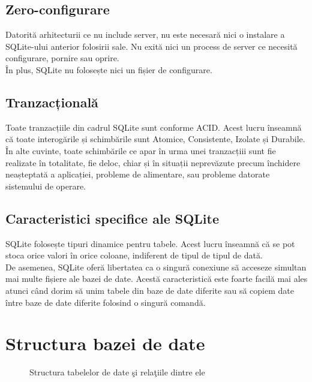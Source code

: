 \subsection{Zero-configurare}
Datorită arhitecturii ce nu include server, nu este necesară nici o instalare a SQLite-ului anterior folosirii sale. Nu exită nici un process de server ce necesită configurare, pornire sau oprire.
\vspace{6pt}
\\În plus, SQLite nu folosește nici un fișier de configurare.

\subsection{Tranzacțională}
Toate tranzacțiile din cadrul SQLite sunt conforme ACID. Acest lucru înseamnă că toate interogările și schimbările sunt Atomice, Consistente, Izolate și Durabile.
\vspace{6pt}
\\În alte cuvinte, toate schimbările ce apar în urma unei tranzacțiii sunt fie realizate în totalitate, fie deloc, chiar și în situații neprevăzute precum închidere neașteptată a aplicației, probleme de alimentare, sau probleme datorate sistemului de operare.

\subsection{Caracteristici specifice ale SQLite}
SQLite folosește tipuri dinamice pentru tabele. Acest lucru înseamnă că se pot stoca orice valori în orice coloane, indiferent de tipul de tipul de dată.
\vspace{6pt}
\\De asemenea, SQLite oferă libertatea ca o singură conexiune să acceseze simultan mai multe fișiere ale bazei de date. Acestă caracteristică este foarte facilă mai ales atunci când dorim să unim tabele din baze de date diferite sau să copiem date între baze de date diferite folosind o singură comandă.


\section{Structura bazei de date}

\begin{figure}[h!]
  \centering
  \caption{Structura tabelelor de date şi relaţiile dintre ele}
\end{figure}

